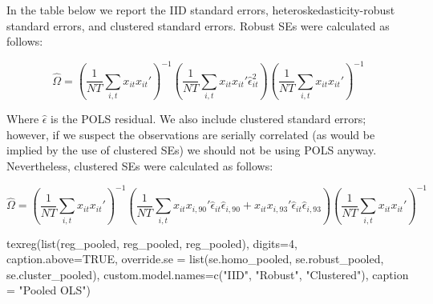 \documentclass[
]{article}
\newenvironment{Shaded}{\begin{snugshade}}{\end{snugshade}}
\newcommand{\AttributeTok}[1]{\textcolor[rgb]{0.77,0.63,0.00}{#1}}
\newcommand{\ConstantTok}[1]{\textcolor[rgb]{0.00,0.00,0.00}{#1}}
\newcommand{\DecValTok}[1]{\textcolor[rgb]{0.00,0.00,0.81}{#1}}
\newcommand{\FunctionTok}[1]{\textcolor[rgb]{0.00,0.00,0.00}{#1}}
\newcommand{\NormalTok}[1]{#1}
\newcommand{\StringTok}[1]{\textcolor[rgb]{0.31,0.60,0.02}{#1}}
\begin{document}
In the table below we report the IID standard errors,
heteroskedasticity-robust standard errors, and clustered standard
errors. Robust SEs were calculated as follows:

\[
\hat{\Omega} = \left( \frac{1}{NT} \sum_{i,t} x_{it} x_{it}'\right)^{-1} \left( \frac{1}{NT} \sum_{i,t} x_{it} x_{it}' \hat{\epsilon}_{it}^2 \right) \left( \frac{1}{NT} \sum_{i,t} x_{it} x_{it}'\right)^{-1}
\]

Where \(\hat{\epsilon}\) is the POLS residual. We also include clustered
standard errors; however, if we suspect the observations are serially
correlated (as would be implied by the use of clustered SEs) we should
not be using POLS anyway. Nevertheless, clustered SEs were calculated as
follows:

\[
\hat{\Omega} = \left( \frac{1}{NT} \sum_{i,t} x_{it} x_{it}'\right)^{-1} \left( \frac{1}{NT} \sum_{i,t}  x_{it} x_{i,90}' \hat{\epsilon}_{it} \hat{\epsilon}_{i,90} + x_{it} x_{i,93}' \hat{\epsilon}_{it} \hat{\epsilon}_{i,93} \right) \left( \frac{1}{NT} \sum_{i,t} x_{it} x_{it}'\right)^{-1}
\]

\newpage

\begin{Shaded}
\begin{Highlighting}[]
\FunctionTok{texreg}\NormalTok{(}\FunctionTok{list}\NormalTok{(reg\_pooled, reg\_pooled, reg\_pooled), }\AttributeTok{digits=}\DecValTok{4}\NormalTok{, }\AttributeTok{caption.above=}\ConstantTok{TRUE}\NormalTok{,}
       \AttributeTok{override.se =} \FunctionTok{list}\NormalTok{(se.homo\_pooled, se.robust\_pooled, se.cluster\_pooled),}
       \AttributeTok{custom.model.names=}\FunctionTok{c}\NormalTok{(}\StringTok{"IID"}\NormalTok{, }\StringTok{"Robust"}\NormalTok{, }\StringTok{"Clustered"}\NormalTok{),}
       \AttributeTok{caption =} \StringTok{"Pooled OLS"}\NormalTok{)}
\end{Highlighting}
\end{Shaded}
\end{document}
